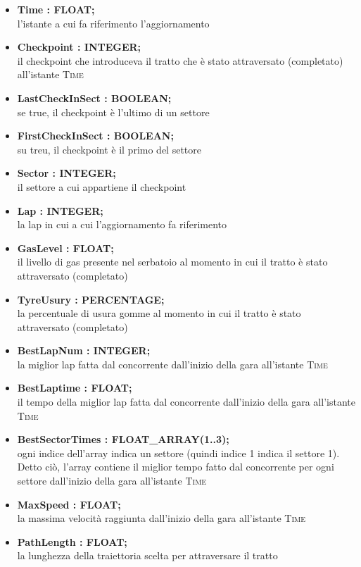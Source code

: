 \begin{itemize}
      \item\textbf{Time : FLOAT;}\\l'istante a cui fa riferimento l'aggiornamento
      \item\textbf{Checkpoint : INTEGER;}\\il checkpoint che introduceva il tratto che \`{e} stato attraversato (completato) all'istante \textsc{Time}
      \item\textbf{LastCheckInSect : BOOLEAN;}\\se true, il checkpoint \`{e} l'ultimo di un settore
      \item\textbf{FirstCheckInSect : BOOLEAN;}\\su treu, il checkpoint \`{e} il primo del settore
      \item\textbf{Sector : INTEGER;}\\il settore a cui appartiene il checkpoint
      \item\textbf{Lap : INTEGER;}\\la lap in cui a cui l'aggiornamento fa riferimento
      \item\textbf{GasLevel : FLOAT;}\\il livello di gas presente nel serbatoio al momento in cui il tratto \`{e} stato attraversato (completato)
      \item\textbf{TyreUsury : PERCENTAGE;}\\la percentuale di usura gomme al momento in cui il tratto \`{e} stato attraversato (completato)
      \item\textbf{BestLapNum : INTEGER;}\\la miglior lap fatta dal concorrente dall'inizio della gara all'istante \textsc{Time}
      \item\textbf{BestLaptime : FLOAT;}\\il tempo della miglior lap fatta dal concorrente dall'inizio della gara all'istante \textsc{Time}
      \item\textbf{BestSectorTimes : FLOAT\_ARRAY(1..3);}\\ogni indice dell'array indica un settore (quindi indice 1 indica il settore 1). Detto ci\`{o},
      l'array contiene il miglior tempo fatto dal concorrente per ogni settore dall'inizio della gara all'istante \textsc{Time}
      \item\textbf{MaxSpeed : FLOAT;}\\la massima velocit\`{a} raggiunta dall'inizio della gara all'istante \textsc{Time}
      \item\textbf{PathLength : FLOAT;}\\la lunghezza della traiettoria scelta per attraversare il tratto
\end{itemize}
